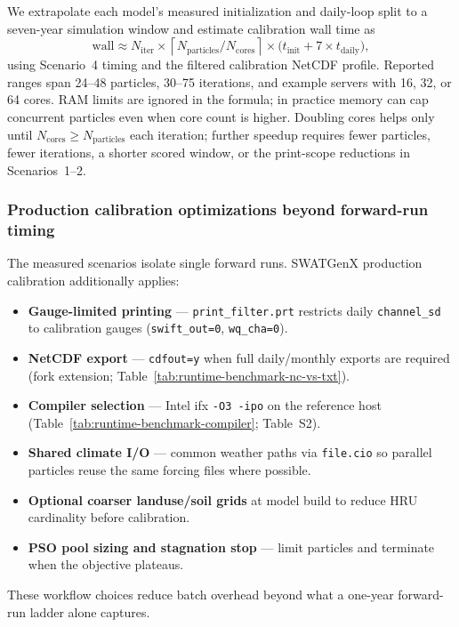 We extrapolate each model's measured initialization and daily-loop split to a seven-year simulation window and estimate calibration wall time as
\[
\text{wall} \approx N_{\mathrm{iter}} \times \left\lceil N_{\mathrm{particles}} / N_{\mathrm{cores}} \right\rceil \times \bigl(t_{\mathrm{init}} + 7 \times t_{\mathrm{daily}}\bigr),
\]
using Scenario~4 timing and the filtered calibration NetCDF profile.
Reported ranges span 24--48 particles, 30--75 iterations, and example servers with 16, 32, or 64 cores.
RAM limits are ignored in the formula; in practice memory can cap concurrent particles even when core count is higher.
Doubling cores helps only until $N_{\mathrm{cores}} \geq N_{\mathrm{particles}}$ each iteration; further speedup requires fewer particles, fewer iterations, a shorter scored window, or the print-scope reductions in Scenarios~1--2.

\subsubsection{Production calibration optimizations beyond forward-run timing}
\label{sec:supp-runtime-optimization-stack}

The measured scenarios isolate single forward runs.
SWATGenX production calibration additionally applies:
\begin{itemize}
  \item \textbf{Gauge-limited printing} --- \texttt{print\_filter.prt} restricts daily \texttt{channel\_sd} to calibration gauges (\texttt{swift\_out=0}, \texttt{wq\_cha=0}).
  \item \textbf{NetCDF export} --- \texttt{cdfout=y} when full daily/monthly exports are required (fork extension; Table~\ref{tab:runtime-benchmark-nc-vs-txt}).
  \item \textbf{Compiler selection} --- Intel ifx \texttt{-O3 -ipo} on the reference host (Table~\ref{tab:runtime-benchmark-compiler}; Table~S2).
  \item \textbf{Shared climate I/O} --- common weather paths via \texttt{file.cio} so parallel particles reuse the same forcing files where possible.
  \item \textbf{Optional coarser landuse/soil grids} at model build to reduce HRU cardinality before calibration.
  \item \textbf{PSO pool sizing and stagnation stop} --- limit particles and terminate when the objective plateaus.
\end{itemize}
These workflow choices reduce batch overhead beyond what a one-year forward-run ladder alone captures.
